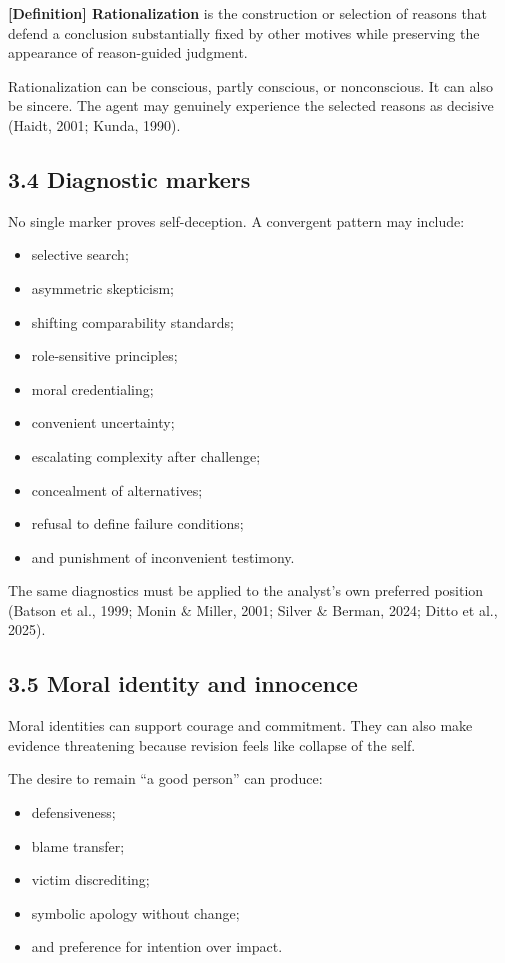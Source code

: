 \documentclass[
  11pt,
]{article}
\providecommand{\tightlist}{%
  \setlength{\itemsep}{0pt}\setlength{\parskip}{0pt}}
\begin{document}
\textbf{{[}Definition{]} Rationalization} is the construction or
selection of reasons that defend a conclusion substantially fixed by
other motives while preserving the appearance of reason-guided judgment.

Rationalization can be conscious, partly conscious, or nonconscious. It
can also be sincere. The agent may genuinely experience the selected
reasons as decisive (Haidt, 2001; Kunda, 1990).

\subsection{3.4 Diagnostic markers}\label{diagnostic-markers}

No single marker proves self-deception. A convergent pattern may
include:

\begin{itemize}
\tightlist
\item
  selective search;
\item
  asymmetric skepticism;
\item
  shifting comparability standards;
\item
  role-sensitive principles;
\item
  moral credentialing;
\item
  convenient uncertainty;
\item
  escalating complexity after challenge;
\item
  concealment of alternatives;
\item
  refusal to define failure conditions;
\item
  and punishment of inconvenient testimony.
\end{itemize}

The same diagnostics must be applied to the analyst's own preferred
position (Batson et al., 1999; Monin \& Miller, 2001; Silver \& Berman,
2024; Ditto et al., 2025).

\subsection{3.5 Moral identity and
innocence}\label{moral-identity-and-innocence}

Moral identities can support courage and commitment. They can also make
evidence threatening because revision feels like collapse of the self.

The desire to remain ``a good person'' can produce:

\begin{itemize}
\tightlist
\item
  defensiveness;
\item
  blame transfer;
\item
  victim discrediting;
\item
  symbolic apology without change;
\item
  and preference for intention over impact.
\end{itemize}
\end{document}
